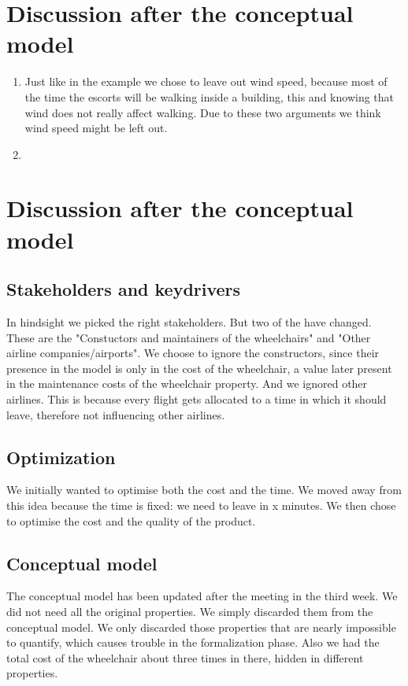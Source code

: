 \documentclass[a4paper, 11pt, notitlepage]{report}
\begin{document}
\chapter{Discussion after the conceptual model}
\begin{enumerate}
    \item   Just like in the example we chose to leave out wind speed, because most of the time the escorts will be walking inside a building, this and knowing that wind does not really affect walking. Due to these two arguments we think wind speed might be left out.
    \item
\end{enumerate}

\chapter{Discussion after the conceptual model}
	\section{Stakeholders and keydrivers} In hindsight we picked the right stakeholders. But two of the have changed. These are the "Constuctors and maintainers of the wheelchairs" and "Other airline companies/airports". We choose to ignore the constructors, since their presence in the model is only in the cost of the wheelchair, a value later present in the maintenance costs of the wheelchair property.  And we ignored other airlines. This is because every flight gets allocated to a time in which it should leave, therefore not influencing other airlines. %
	
	\section{Optimization} We initially wanted to optimise both the cost and the time. We moved away from this idea because the time is fixed: we need to leave in x minutes. We then chose to optimise the cost and the quality of the product.
	
	\section{Conceptual model} The conceptual model has been updated after the meeting in the third week. We did not need all the original properties. We simply discarded them from the conceptual model. We only discarded those properties that are nearly impossible to quantify, which causes trouble in the formalization phase. Also we had the total cost of the wheelchair about three times in there, hidden in different properties.
	
\end{document}
